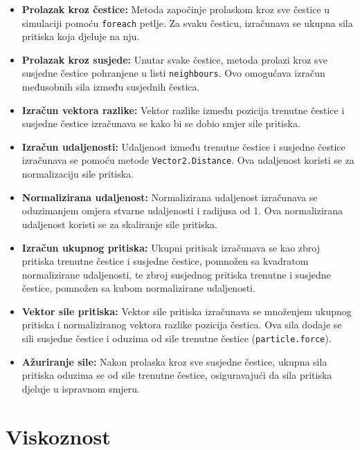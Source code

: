 \documentclass[diplomskirad]{fer}
\begin{document}
    \begin{itemize}
        \item \textbf{Prolazak kroz čestice:} Metoda započinje prolaskom kroz sve čestice u simulaciji pomoću \texttt{foreach} petlje.
        Za svaku česticu, izračunava se ukupna sila pritiska koja djeluje na nju.

        \item \textbf{Prolazak kroz susjede:} Unutar svake čestice, metoda prolazi kroz sve susjedne čestice pohranjene u listi \texttt{neighbours}.
        Ovo omogućava izračun međusobnih sila između susjednih čestica.

        \item \textbf{Izračun vektora razlike:} Vektor razlike između pozicija trenutne čestice i susjedne čestice izračunava se kako bi se dobio smjer sile pritiska.

        \item \textbf{Izračun udaljenosti:} Udaljenost između trenutne čestice i susjedne čestice izračunava se pomoću metode \texttt{Vector2.Distance}.
        Ova udaljenost koristi se za normalizaciju sile pritiska.

        \item \textbf{Normalizirana udaljenost:} Normalizirana udaljenost izračunava se oduzimanjem omjera stvarne udaljenosti i radijusa od 1.
        Ova normalizirana udaljenost koristi se za skaliranje sile pritiska.

        \item \textbf{Izračun ukupnog pritiska:} Ukupni pritisak izračunava se kao zbroj pritiska trenutne čestice i susjedne čestice, pomnožen sa kvadratom normalizirane udaljenosti, te zbroj susjednog pritiska trenutne i susjedne čestice, pomnožen sa kubom normalizirane udaljenosti.

        \item \textbf{Vektor sile pritiska:} Vektor sile pritiska izračunava se množenjem ukupnog pritiska i normaliziranog vektora razlike pozicija čestica.
        Ova sila dodaje se sili susjedne čestice i oduzima od sile trenutne čestice (\texttt{particle.force}).

        \item \textbf{Ažuriranje sile:} Nakon prolaska kroz sve susjedne čestice, ukupna sila pritiska oduzima se od sile trenutne čestice, osiguravajući da sila pritiska djeluje u ispravnom smjeru.
    \end{itemize}

    \section{Viskoznost}\label{sec:viskoznost}
\end{document}
